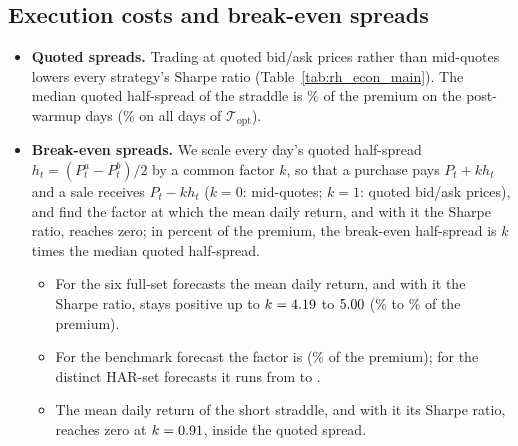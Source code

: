 \subsection{Execution costs and break-even spreads}
\label{app:rh_econ_breakeven}
\begin{itemize}
\item \textbf{Quoted spreads.} Trading at quoted bid/ask prices rather than mid-quotes lowers every strategy's Sharpe
  ratio (Table~\ref{tab:rh_econ_main}). The median quoted half-spread of the straddle is \rhemHalfSpreadMed\% of the
  premium on the \rheSzDays{} post-warmup days (\rhemHalfSpreadMedAll\% on all \cmNdays{} days of
  $\mathcal T_{\mathrm{opt}}$).
\item \textbf{Break-even spreads.} We scale every day's quoted half-spread $h_t = (P^{a}_t - P^{b}_t)/2$ by a common
  factor $k$, so that a purchase pays $P_t + k h_t$ and a sale receives $P_t - k h_t$ ($k = 0$: mid-quotes; $k = 1$:
  quoted bid/ask prices), and find the factor at which the mean daily return, and with it the Sharpe ratio, reaches
  zero; in percent of the premium, the break-even half-spread is $k$ times the median quoted half-spread.
  \begin{itemize}
  \item For the six full-set forecasts the mean daily return, and with it the Sharpe ratio, stays positive up to
    $k = 4.19$ to $5.00$ (\rhemBeMeanFullMinPct\% to \rhemBeMeanFullMaxPct\% of the
    premium).
  \item For the benchmark forecast the factor is \rhemBeMeanRidgeHar{} (\rhemBeMeanPctRidgeHar\% of the premium); for
    the \rhemHarDistinctWord{} distinct HAR-set forecasts it runs from \rhemBeMeanHarMin{} to \rhemBeMeanHarMax.
  \item The mean daily return of the short straddle, and with it its Sharpe ratio, reaches zero at
    $k = 0.91$, inside the quoted spread.
  \end{itemize}

\end{itemize}
